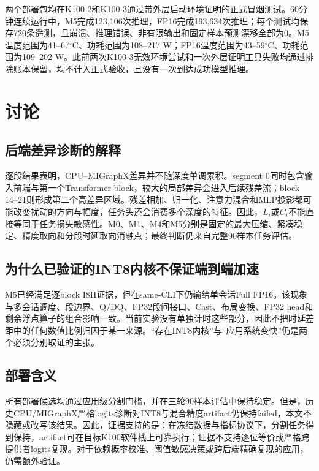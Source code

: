 \documentclass[conference]{IEEEtran}
\begin{document}
两个部署包均在K100-2和K100-3通过带外层启动环境证明的正式冒烟测试。60分钟连续运行中，M5完成123,106次推理，FP16完成193,634次推理；每个测试均保存720条遥测，且崩溃、推理错误、非有限输出和固定样本预测漂移全部为0。M5温度范围为41--67$^{\circ}$C、功耗范围为108--217 W；FP16温度范围为43--59$^{\circ}$C、功耗范围为109--202 W。此前两次K100-3无效环境尝试和一次外层证明工具失败均通过排除账本保留，均不计入正式验收，且没有一次到达成功模型推理。

\section{讨论}
\label{sec:discussion_cn}

\subsection{后端差异诊断的解释}

逐段结果表明，CPU--MIGraphX差异并不随深度单调累积。segment 0同时包含输入前端与第一个Transformer block，较大的局部差异会进入后续残差流；block 14--21则形成第二个高差异区域。残差相加、归一化、注意力混合和MLP投影都可能改变扰动的方向与幅度，任务头还会消费多个深度的特征。因此，$L_i$或$C_i$不能直接等同于任务损失敏感性。M0、M1、M4和M5分别是固定的最大压缩、紧凑稳定、精度取向和分段时延取向消融点；最终判断仍来自完整90样本任务评估。

\subsection{为什么已验证的INT8内核不保证端到端加速}

M5已经满足逐block I8II证据，但在same-CLI下仍输给单会话Full FP16。该现象与多会话调度、段边界、Q/DQ、FP32段间接口、Cast、布局变换、FP32 head和剩余浮点算子的组合影响一致。当前实验没有单独计时这些部分，因此不把时延差距中的任何数值比例归因于某一来源。“存在INT8内核”与“应用系统变快”仍是两个必须分别取证的主张。

\subsection{部署含义}

所有部署候选均通过应用级分割门槛，并在三轮90样本评估中保持稳定。但是，历史CPU/MIGraphX严格logits诊断对INT8与混合精度artifact仍保持failed，本文不隐藏或改写该结果。因此，证据支持的是：在冻结数据与指标协议下，分割任务得到保持，artifact可在目标K100软件栈上可靠执行；证据不支持逐位等价或严格跨提供者logits复现。对于依赖概率校准、阈值敏感决策或跨后端精确复现的应用，仍需额外验证。
\end{document}
